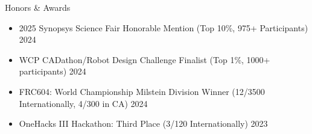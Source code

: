 \documentclass[
  10pt, %
]{resume}
\begin{document}
\begin{rSection}{Honors \& Awards}

  \begin{itemize}
      \setlength\itemsep{-0.7em} %
        
      \item 2025 Synopsys Science Fair Honorable Mention (Top 10\%, 975+ Participants) \hfill 2024
              
      \item WCP CADathon/Robot Design Challenge Finalist (Top 1\%, 1000+ participants) \hfill 2024
              
      \item FRC604: World Championship Milstein Division Winner (12/3500 Internationally, 4/300 in CA) \hfill 2024
              
      \item OneHacks III Hackathon: Third Place (3/120 Internationally) \hfill 2023
              


    \end{itemize}

\end{rSection}
\end{document}
